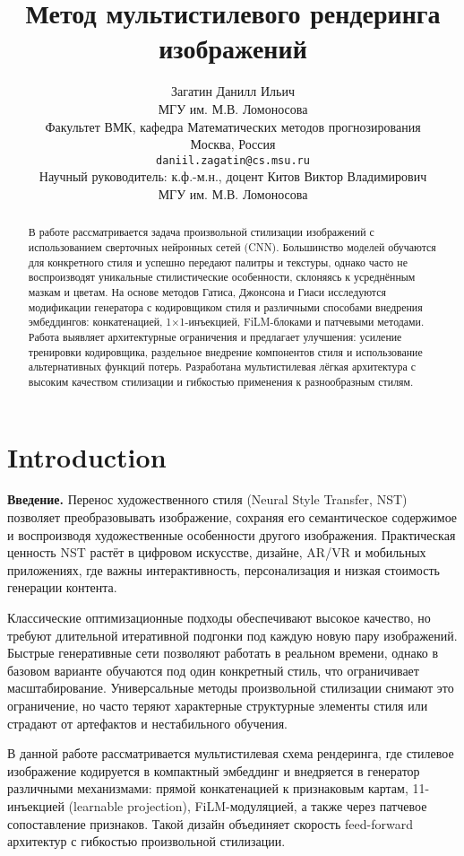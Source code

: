\documentclass{article}
\title{Метод мультистилевого рендеринга изображений}
\author{
  Загатин Данилл Ильич \\
  МГУ им. М.В. Ломоносова \\
  Факультет ВМК, кафедра Математических методов прогнозирования \\
  Москва, Россия \\
  \texttt{daniil.zagatin@cs.msu.ru} \\
  \And
  Научный руководитель: к.ф.-м.н., доцент Китов Виктор Владимирович \\
  МГУ им. М.В. Ломоносова
}
\date{}
\begin{document}
\maketitle

\begin{abstract}
В работе рассматривается задача произвольной стилизации изображений с использованием сверточных нейронных сетей (CNN). Большинство моделей обучаются для конкретного стиля и успешно передают палитры и текстуры, однако часто не воспроизводят уникальные стилистические особенности, склоняясь к усреднённым мазкам и цветам. На основе методов Гатиса, Джонсона и Гиаси исследуются модификации генератора с кодировщиком стиля и различными способами внедрения эмбеддингов: конкатенацией, 1×1-инъекцией, FiLM-блоками и патчевыми методами. Работа выявляет архитектурные ограничения и предлагает улучшения: усиление тренировки кодировщика, раздельное внедрение компонентов стиля и использование альтернативных функций потерь. Разработана мультистилевая лёгкая архитектура с высоким качеством стилизации и гибкостью применения к разнообразным стилям.
\end{abstract}


\section{Introduction}
\textbf{Введение.}
Перенос художественного стиля (Neural Style Transfer, NST) позволяет преобразовывать изображение, сохраняя его семантическое содержимое и воспроизводя художественные особенности другого изображения. Практическая ценность NST растёт в цифровом искусстве, дизайне, AR/VR и мобильных приложениях, где важны интерактивность, персонализация и низкая стоимость генерации контента.

Классические оптимизационные подходы обеспечивают высокое качество, но требуют длительной итеративной подгонки под каждую новую пару изображений. Быстрые генеративные сети позволяют работать в реальном времени, однако в базовом варианте обучаются под один конкретный стиль, что ограничивает масштабирование. Универсальные методы произвольной стилизации снимают это ограничение, но часто теряют характерные структурные элементы стиля или страдают от артефактов и нестабильного обучения.

В данной работе рассматривается мультистилевая схема рендеринга, где стилевое изображение кодируется в компактный эмбеддинг и внедряется в генератор различными механизмами: прямой конкатенацией к признаковым картам, 1{\texttimes}1-инъекцией (learnable projection), FiLM-модуляцией, а также через патчевое сопоставление признаков. Такой дизайн объединяет скорость feed-forward архитектур с гибкостью произвольной стилизации.
\end{document}
